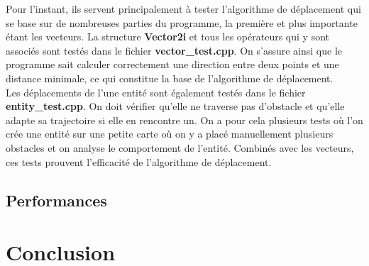 \documentclass[11pt]{article} %
\begin{document}
Pour l'instant, ils servent principalement à tester l'algorithme de déplacement qui se base sur de nombreuses parties du programme, la première et plus importante étant les vecteurs. La structure \textbf{Vector2i} et tous les opérateurs qui y sont associés sont testés dans le fichier \textbf{vector\_test.cpp}. On s'assure ainsi que le programme sait calculer correctement une direction entre deux points et une distance minimale, ce qui constitue la base de l'algorithme de déplacement. \\
Les déplacements de l'une entité sont également testés dans le fichier \textbf{entity\_test.cpp}. On doit vérifier qu'elle ne traverse pas d'obstacle et qu'elle adapte sa trajectoire si elle en rencontre un. On a pour cela plusieurs tests où l'on crée une entité sur une petite carte où on y a placé manuellement plusieurs obstacles et on analyse le comportement de l'entité. Combinés avec les vecteurs, ces tests prouvent l'efficacité de l'algorithme de déplacement.

\subsection{Performances}

\section{Conclusion}
\end{document}

